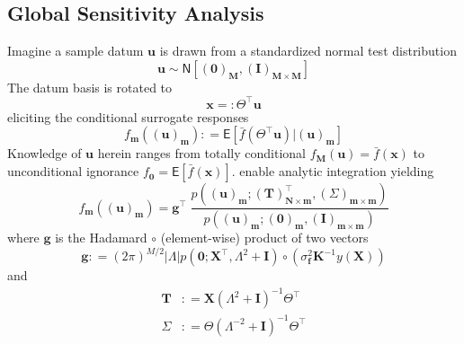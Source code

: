 \documentclass[preprint,12pt]{elsarticle}
\newcommand*{\M}[1]{\ensuremath{#1}\xspace}
\newcommand*{\vr}[1]{\M{\mathbf{#1}}}
\newcommand*{\deq}{\M{\mathrel{\mathop:}=}}
\newcommand*{\deqr}{\M{=\mathrel{\mathop:}}}
\newcommand*{\ev}[1]{\mathsf{E}\!\left\lbrack{} #1 \right\rbrack}
\newcommand*{\gauss}[2]{\mathsf{N}\!\left\lbrack{} #1 , #2 \right\rbrack}
\newcommand*{\modulus}[1]{\M{\left\lvert#1\right\rvert}}
\begin{document}
        \subsection{Global Sensitivity Analysis} \label{sub:Method:GSA}
            Imagine a sample datum \(\vr{u}\) is drawn from a standardized normal test distribution
            \begin{equation} \label{eq:Method:GSA:uDist}
                \vr{u} \sim \gauss{(\vr{0})_{\vr{M}}}{(\vr{I})_{\vr{M}\times\vr{M}}}
            \end{equation}
            The datum basis is rotated to
            \begin{equation} \label{eq:Method:GSA:Rotation}
                \vr{x} \deqr \Theta^{\intercal} \vr{u}
            \end{equation}
            eliciting the conditional surrogate responses
            \begin{equation} \label{eq:Method:GSA:fmDef}
                f_{\vr{m}}((\vr{u})_{\vr{m}}) 
                    \deq \ev{\bar{f}(\Theta^{\intercal} \vr{u}) \vert (\vr{u})_{\vr{m}}}
            \end{equation}    
            Knowledge of $\vr{u}$ herein ranges from totally conditional $f_{\vr{M}}(\vr{u})=\bar{f}(\vr{x})$ to unconditional ignorance $f_{\vr{0}}=\ev{\bar{f}(\vr{x})}$.
             enable analytic integration yielding
            \begin{equation} \label{eq:Method:GSA:fmCalc}
                f_{\vr{m}}((\vr{u})_{\vr{m}}) = \vr{g}^{\intercal} \; 
				\frac 
					{p\!\left((\vr{u})_{\vr{m}} ; (\vr{T})_{\vr{N}\times\vr{m}}^{\intercal}, (\Sigma)_{\vr{m}\times\vr{m}}\right)}
					{p\!\left((\vr{u})_{\vr{m}} ; (\vr{0})_{\vr{m}},(\vr{I})_{\vr{m}\times\vr{m}}\right)}
            \end{equation}
            where $\vr{g}$ is the Hadamard $\circ$ (element-wise) product of two vectors
            \begin{equation} \label{eq:Method:GSA:gDef}
                \vr{g} \deq
                (2 \pi)^{M/2} \modulus{\Lambda} p\!\left(\vr{0};\vr{X}^{\intercal} , \Lambda^{2} + \vr{I}\right)
                \circ\left(\sigma^{2}_\vr{f} \vr{K}^{-1} y(\vr{X})\right) 
            \end{equation}
            and
            \begin{align} \label{eq:Method:GSA:TSigmaDef}
                \vr{T} &\deq 
                    \vr{X} \left(\Lambda^{2} + \vr{I}\right)^{-1} \Theta^{\intercal} \\
                \Sigma &\deq 
                    \Theta \left(\Lambda^{-2} + \vr{I}\right)^{-1} \Theta^{\intercal}
            \end{align}
\end{document}
